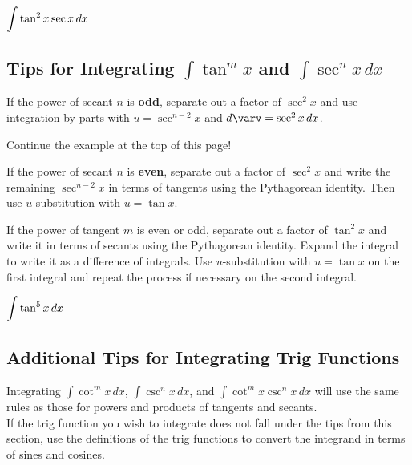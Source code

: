 \documentclass[12pt]{article}
\begin{document}
\Example $\displaystyle\int\tan^2x\sec x \,dx$

\vspace{40mm}

\subsection*{Tips for Integrating $\int\tan^m x$ and $\int\sec^n x\,dx$}

If the power of secant $n$ is \textbf{odd}, separate out a factor of $\sec^2 x$ and use integration by parts with $u=\sec^{n-2}x$ and $d\varv=\sec^2x\,dx$.

\ExampleCont Continue the example at the top of this page!


\vfill

If the power of secant $n$ is \textbf{even}, separate out a factor of $\sec^2x$ and write the remaining $\sec^{n-2}x$ in terms of tangents using the Pythagorean identity. Then use $u$-substitution with $u=\tan x$. 

\newpage

If the power of tangent $m$ is even or odd, separate out a factor of $\tan^2x$ and write it in terms of secants using the Pythagorean identity. Expand the integral to write it as a difference of integrals. Use $u$-substitution with $u=\tan x$ on the first integral and repeat the process if necessary on the second integral.

\Example $\displaystyle\int\tan^5 x\,dx$

\vfill

\subsection*{Additional Tips for Integrating Trig Functions}

Integrating $\int\cot^m x\,dx$, $\int \csc^n x\,dx$, and $\int\cot^m x\csc^n x\,dx$ will use the same rules as those for powers and products of tangents and secants.\\

If the trig function you wish to integrate does not fall under the tips from this section, use the definitions of the trig functions to convert the integrand in terms of sines and cosines.
\end{document}
